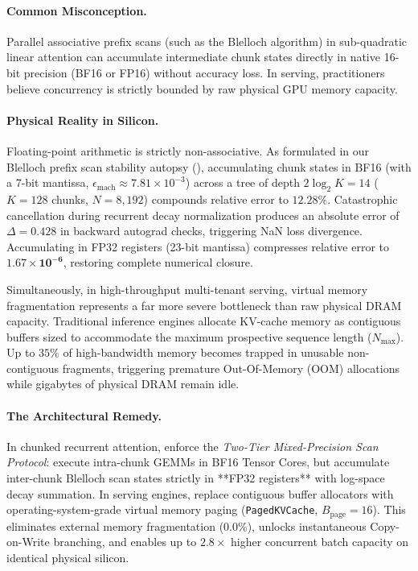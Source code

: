 \paragraph{Common Misconception.}
Parallel associative prefix scans (such as the Blelloch algorithm) in sub-quadratic linear attention can accumulate intermediate chunk states directly in native 16-bit precision (BF16 or FP16) without accuracy loss.
In serving, practitioners believe concurrency is strictly bounded by raw physical GPU memory capacity.

\paragraph{Physical Reality in Silicon.}
Floating-point arithmetic is strictly non-associative.
As formulated in our Blelloch prefix scan stability autopsy (), accumulating chunk states in BF16 (with a 7-bit mantissa, $\epsilon_{\text{mach}} \approx 7.81 \times 10^{-3}$) across a tree of depth $2 \log_2 K = 14$ ($K=128$ chunks, $N=8{,}192$) compounds relative error to $\mathbf{12.28\%}$.
Catastrophic cancellation during recurrent decay normalization produces an absolute error of $\Delta = 0.428$ in backward autograd checks, triggering NaN loss divergence.
Accumulating in FP32 registers (23-bit mantissa) compresses relative error to $\mathbf{1.67 \times 10^{-6}}$, restoring complete numerical closure.

Simultaneously, in high-throughput multi-tenant serving, virtual memory fragmentation represents a far more severe bottleneck than raw physical DRAM capacity.
Traditional inference engines allocate KV-cache memory as contiguous buffers sized to accommodate the maximum prospective sequence length ($N_{\max}$).
Up to $35\%$ of high-bandwidth memory becomes trapped in unusable non-contiguous fragments, triggering premature Out-Of-Memory (OOM) allocations while gigabytes of physical DRAM remain idle.

\paragraph{The Architectural Remedy.}
In chunked recurrent attention, enforce the \emph{Two-Tier Mixed-Precision Scan Protocol}: execute intra-chunk GEMMs in BF16 Tensor Cores, but accumulate inter-chunk Blelloch scan states strictly in **FP32 registers** with log-space decay summation.
In serving engines, replace contiguous buffer allocators with operating-system-grade virtual memory paging (\texttt{PagedKVCache}, $B_{\text{page}} = 16$).
This eliminates external memory fragmentation ($0.0\%$), unlocks instantaneous Copy-on-Write branching, and enables up to $2.8\times$ higher concurrent batch capacity on identical physical silicon.

